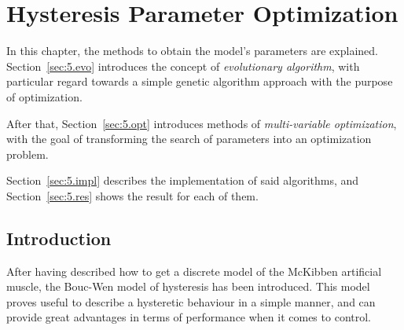 
\chapter{Hysteresis Parameter Optimization}
\label{ch:optimization}

In this chapter, the methods to obtain the model's parameters are explained.
Section~\ref{sec:5.evo} introduces the concept of \textit{evolutionary algorithm},
with particular regard towards a simple genetic algorithm approach
with the purpose of optimization.

After that, Section~\ref{sec:5.opt} introduces methods of \textit{multi-variable
optimization}, with the goal of transforming the search of parameters
into an optimization problem.

Section~\ref{sec:5.impl} describes the implementation of said algorithms,
and Section~\ref{sec:5.res} shows the result for each of them.


\section{Introduction}
After having described how to get a discrete model of the McKibben artificial muscle,
the Bouc-Wen model of hysteresis has been introduced.
This model proves useful to describe a hysteretic behaviour in a simple manner,
and can provide great advantages in terms of performance when it comes to control.

